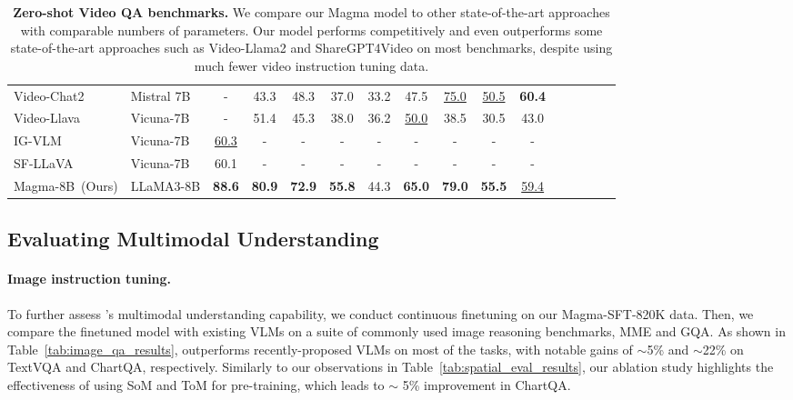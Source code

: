 \begin{table*}[t]
{\begin{tabular}{l|lcccccccccccccc}
          Video-Chat2~\cite{li2024mvbenchcomprehensivemultimodalvideo} & Mistral 7B  & - & 43.3 & 48.3 & 37.0 & 33.2 & 47.5 & \underline{75.0} & \underline{50.5} & \textbf{60.4}\\
          Video-Llava~\cite{lin2023video} & Vicuna-7B  & - & 51.4 & 45.3 & 38.0 & 36.2 & \underline{50.0} & 38.5 & 30.5 & 43.0\\ 
          IG-VLM~\cite{kim2024image} & Vicuna-7B & \underline{60.3} & - & - & - & - & - & - & - & -\\
          SF-LLaVA~\cite{xu2024slowfast} & Vicuna-7B & 60.1 & - & - & - & - & - & - & - & -\\ 
          \midrule
           Magma-8B~(Ours) & LLaMA3-8B  & \textbf{88.6} & \textbf{80.9} & \textbf{72.9} & \textbf{55.8} & 44.3 & \textbf{65.0} & \textbf{79.0} & \textbf{55.5} & \underline{59.4}\\
    \end{tabular}}
    \caption{\textbf{Zero-shot Video QA benchmarks.} We compare our Magma model to other state-of-the-art approaches with comparable numbers of parameters. Our \magma model performs competitively and even outperforms some state-of-the-art approaches such as Video-Llama2 and ShareGPT4Video on most benchmarks, despite using much fewer video instruction tuning data.}
    \label{tab:video_qa_results}
\end{table*}

\subsection{Evaluating Multimodal Understanding}

\paragraph{Image instruction tuning.} To further assess \magma's multimodal understanding capability, we conduct continuous finetuning on our Magma-SFT-820K data. Then, we compare the finetuned \magma model with existing VLMs on a suite of commonly used image reasoning benchmarks, \eg MME and GQA. As shown in Table~\ref{tab:image_qa_results}, \magma outperforms recently-proposed VLMs on most of the tasks, with notable gains of $\sim$5\% and $\sim$22\% on TextVQA and ChartQA, respectively. Similarly to our observations in Table~\ref{tab:spatial_eval_results}, our ablation study highlights the effectiveness of using SoM and ToM for pre-training, which leads to $\sim$ 5\% improvement in ChartQA.

